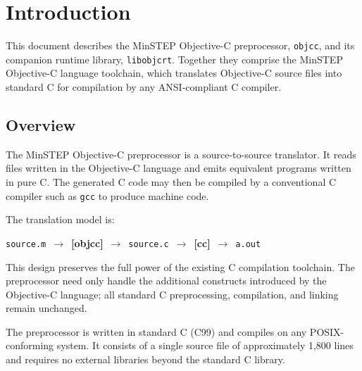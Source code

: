 \documentclass[11pt,twoside]{article}
\newcommand{\objcc}{{\tt objcc}}
\newcommand{\libobjcrt}{{\tt libobjcrt}}
\begin{document}
\newpage


\tableofcontents
\newpage

\section{Introduction}

This document describes the MinSTEP Objective-C preprocessor, \objcc,
and its companion runtime library, \libobjcrt.  Together they comprise
the MinSTEP Objective-C language toolchain, which translates Objective-C
source files into standard C for compilation by any ANSI-compliant C
compiler.

\subsection{Overview}

The MinSTEP Objective-C preprocessor is a source-to-source translator.
It reads files written in the Objective-C language and emits equivalent
programs written in pure C.  The generated C code may then be compiled
by a conventional C compiler such as {\tt gcc} to produce machine code.

The translation model is:
\begin{center}
{\tt source.m}~$\longrightarrow$~{\bfseries [objcc]}~$\longrightarrow$~{\tt source.c}~$\longrightarrow$~{\bfseries [cc]}~$\longrightarrow$~{\tt a.out}
\end{center}

This design preserves the full power of the existing C compilation
toolchain.  The preprocessor need only handle the additional constructs
introduced by the Objective-C language; all standard C preprocessing,
compilation, and linking remain unchanged.

The preprocessor is written in standard C (C99) and compiles on any
POSIX-conforming system.  It consists of a single source file of
approximately 1{,}800 lines and requires no external libraries beyond
the standard C library.
\end{document}

